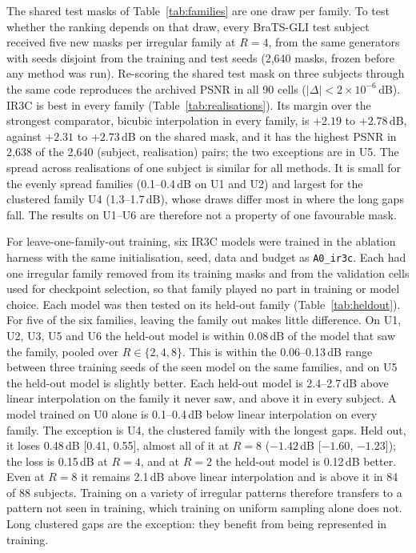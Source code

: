 \documentclass[a4paper,fleqn]{cas-dc}
\begin{document}
The shared test masks of Table~\ref{tab:families} are one draw per family. To test whether
the ranking depends on that draw, every BraTS-GLI test subject received five new masks per
irregular family at $R=4$, from the same generators with seeds disjoint from the training
and test seeds (2{,}640 masks, frozen before any method was run). Re-scoring the shared test
mask on three subjects through the same code reproduces the archived PSNR in all 90 cells
($|\Delta|<2\times10^{-6}$\,dB). IR3C is best in every family (Table~\ref{tab:realisations}). Its
margin over the strongest comparator, bicubic interpolation in every family, is
$+2.19$ to $+2.78$\,dB, against $+2.31$ to $+2.73$\,dB on the shared mask, and it has the highest
PSNR in 2{,}638 of the 2{,}640 (subject, realisation) pairs; the two exceptions are in U5. The
spread across realisations of one subject is similar for all methods. It is small for the
evenly spread families (0.1--0.4\,dB on U1 and U2) and largest for the clustered family U4
(1.3--1.7\,dB), whose draws differ most in where the long gaps fall.
The results on U1--U6 are therefore not a property of one favourable mask.

For leave-one-family-out training, six IR3C models were trained in the ablation harness with
the same initialisation, seed, data and budget as \texttt{A0\_ir3c}. Each had one irregular
family removed from its training masks and from the validation cells used for checkpoint
selection, so that family played no part in training or model choice. Each model was then
tested on its held-out family (Table~\ref{tab:heldout}). For five of the six families,
leaving the family out makes little difference. On U1, U2, U3, U5 and U6 the held-out model
is within 0.08\,dB of the model that saw the family, pooled over $R\in\{2,4,8\}$. This is
within the 0.06--0.13\,dB range between three training seeds of the seen model on the same
families, and on U5 the held-out model is slightly better. Each held-out model is
2.4--2.7\,dB above linear interpolation on the family it never saw, and above it in every
subject. A model trained on U0 alone is 0.1--0.4\,dB below linear interpolation on every
family. The exception is U4, the clustered family with the longest gaps. Held out, it loses
0.48\,dB [0.41, 0.55], almost all of it at $R=8$ ($-1.42$\,dB [$-1.60$, $-1.23$]); the loss
is 0.15\,dB at $R=4$, and at $R=2$ the held-out model is 0.12\,dB better. Even at $R=8$ it
remains 2.1\,dB above linear interpolation and is above it in 84 of 88 subjects. Training on
a variety of irregular patterns therefore transfers to a pattern not seen in training, which
training on uniform sampling alone does not. Long clustered gaps are the exception: they
benefit from being represented in training.
\end{document}

